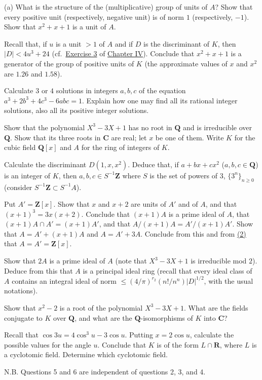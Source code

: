  (a) What is the structure of the (multiplicative) group of units
of $A$? Show that every positive unit (respectively, negative unit) is of
norm $1$ (respectively, $-1$). Show that $x^{2}+x+1$ is a unit of $A$.
\begin{alist}
\item Recall that, if $u$ is a unit $>1$ of $A$ and if $D$ is the
discriminant of $K$, then $|D|<4u^{3}+24$ (cf.\ \hyperref[exer:IV.3]{Exercise 3} of \hyperref[chap:IV]{Chapter IV}).
Conclude that $x^{2}+x+1$ is a generator of the group of positive units of
$K$ (the approximate values of $x$ and $x^{2}$ are $1.26$ and $1.58$).
\item Calculate $3$ or $4$ solutions in integers $a,b,c$ of the equation
$a^{3}+2b^{3}+4c^{3}-6abc=1$. Explain how one may find all its rational
integer solutions, also all its positive integer solutions.
\end{alist}



 Show that the polynomial $X^{3}-3X+1$ has no root in
$\mathbf{Q}$ and is irreducible over $\mathbf{Q}$. Show that its three roots
in $\mathbf{C}$ are real; let $x$ be one of them. Write $K$ for the cubic
field $\mathbf{Q}[x]$ and $A$ for the ring of integers of $K$.

 Calculate the discriminant $D(1,x,x^{2})$. Deduce that, if
$a+bx+cx^{2}$ ($a,b,c\in\mathbf{Q}$) is an integer of $K$, then
$a,b,c\in S^{-1}\mathbf{Z}$ where $S$ is the set of powers of $3$,
$\{3^{n}\}_{n\geq0}$ (consider $S^{-1}\mathbf{Z}\subset S^{-1}A$).

 Put $A'=\mathbf{Z}[x]$. Show that $x$ and $x+2$ are units of
$A'$ and of $A$, and that $(x+1)^{3}=3x(x+2)$. Conclude that $(x+1)A$ is a
prime ideal of $A$, that $(x+1)A\cap A'=(x+1)A'$, and that
$A/(x+1)A=A'/(x+1)A'$. Show that $A=A'+(x+1)A$ and $A=A'+3A$. Conclude from
this and from \hyperref[exer:R3.2]{(2)} that $A=A'=\mathbf{Z}[x]$.

 Show that $2A$ is a prime ideal of $A$ (note that
$X^{3}-3X+1$ is irreducible mod $2$). Deduce from this that $A$ is a
principal ideal ring (recall that every ideal class of $A$ contains an
integral ideal of norm
$\leq(4/\pi)^{r_{2}}(n!/n^{n})|D|^{1/2}$, with the usual notations).

 Show that $x^{2}-2$ is a root of the polynomial $X^{3}-3X+1$.
What are the fields conjugate to $K$ over $\mathbf{Q}$, and what are the
$\mathbf{Q}$-isomorphisms of $K$ into $\mathbf{C}$?

 Recall that $\cos3u=4\cos^{3}u-3\cos u$. Putting $x=2\cos u$,
calculate the possible values for the angle $u$. Conclude that $K$ is of the
form $L\cap\mathbf{R}$, where $L$ is a cyclotomic field. Determine which
cyclotomic field.

\enlargethispage{2\baselineskip}
\medskip
\noindent N.B. Questions 5 and 6 are independent of questions 2, 3, and 4.
